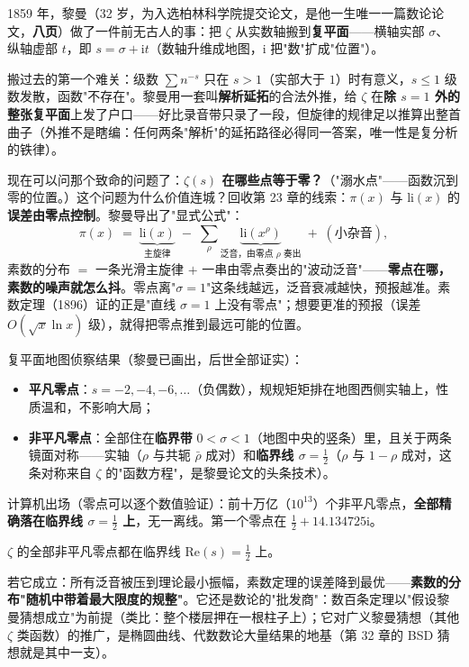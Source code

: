 1859 年，黎曼（32 岁，为入选柏林科学院提交论文，是他一生唯一一篇数论论文，\textbf{八页}）做了一件前无古人的事：把 $\zeta$ 从实数轴搬到\textbf{复平面}——横轴实部 $\sigma$、纵轴虚部 $t$，即 $s = \sigma + \mathrm{i}t$（数轴升维成地图，$\mathrm{i}$ 把"数"扩成"位置"）。

搬过去的第一个难关：级数 $\sum n^{-s}$ 只在 $s > 1$（实部大于 $1$）时有意义，$s \le 1$ 级数发散，函数"不存在"。黎曼用一套叫\textbf{解析延拓}的合法外推，给 $\zeta$ 在\textbf{除 $s=1$ 外的整张复平面}上发了户口——好比录音带只录了一段，但旋律的规律足以推算出整首曲子（外推不是瞎编：任何两条"解析"的延拓路径必得同一答案，唯一性是复分析的铁律）。

现在可以问那个致命的问题了：\textbf{$\zeta(s)$ 在哪些点等于零？}（"溺水点"——函数沉到零的位置。）这个问题为什么价值连城？回收第 23 章的线索：$\pi(x)$ 与 $\mathrm{li}(x)$ 的\textbf{误差由零点控制}。黎曼导出了"显式公式"：
\[
\pi(x) \;=\; \underbrace{\mathrm{li}(x)}_{\text{主旋律}} \;-\; \sum_{\rho}\underbrace{\mathrm{li}(x^{\rho})}_{\text{泛音，由零点 } \rho \text{ 奏出}} \;+\; (\text{小杂音}) ,
\]
素数的分布 $=$ 一条光滑主旋律 $+$ 一串由零点奏出的"波动泛音"——\textbf{零点在哪，素数的噪声就怎么抖}。零点离"$\sigma = 1$"这条线越远，泛音衰减越快，预报越准。素数定理（1896）证的正是"直线 $\sigma=1$ 上没有零点"；想要更准的预报（误差 $O(\sqrt x\ln x)$ 级），就得把零点推到最远可能的位置。

复平面地图侦察结果（黎曼已画出，后世全部证实）：
\begin{itemize}
\item \textbf{平凡零点}：$s = -2, -4, -6, \dots$（负偶数），规规矩矩排在地图西侧实轴上，性质温和，不影响大局；
\item \textbf{非平凡零点}：全部住在\textbf{临界带} $0 < \sigma < 1$（地图中央的竖条）里，且关于两条镜面对称——实轴（$\rho$ 与共轭 $\bar\rho$ 成对）和\textbf{临界线 $\sigma = \tfrac12$}（$\rho$ 与 $1-\rho$ 成对，这条对称来自 $\zeta$ 的"函数方程"，是黎曼论文的头条技术）。
\end{itemize}
计算机出场（零点可以逐个数值验证）：前十万亿（$10^{13}$）个非平凡零点，\textbf{全部精确落在临界线 $\sigma = \tfrac12$ 上}，无一离线。第一个零点在 $\tfrac12 + 14.134725\mathrm{i}$。

\begin{caixiang}[黎曼猜想，1859 年]
$\zeta$ 的全部非平凡零点都在临界线 $\mathrm{Re}(s) = \tfrac12$ 上。
\end{caixiang}

若它成立：所有泛音被压到理论最小振幅，素数定理的误差降到最优——\textbf{素数的分布"随机中带着最大限度的规整"}。它还是数论的"批发商"：数百条定理以"假设黎曼猜想成立"为前提（类比：整个楼层押在一根柱子上）；它对广义黎曼猜想（其他 $\zeta$ 类函数）的推广，是椭圆曲线、代数数论大量结果的地基（第 32 章的 BSD 猜想就是其中一支）。

